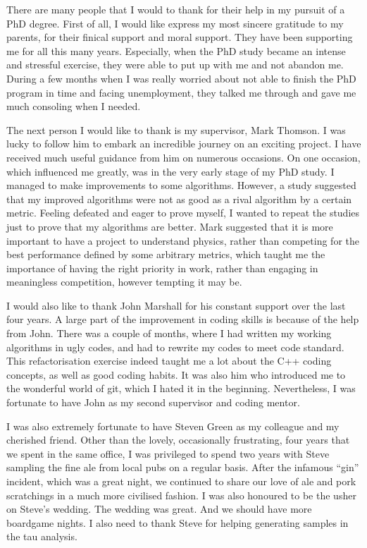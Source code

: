 \begin{acknowledgements}
There are many people that I would to thank  for their help in my pursuit of a PhD degree. First of all, I would like express my most sincere gratitude to my parents, for their finical support and moral support. They have been supporting me for all this many years. Especially, when the PhD study became an intense and stressful exercise, they were able to put up with me and not abandon me. During a few months when I was really worried about not able to finish the PhD program in time and facing unemployment, they talked me through and gave me much consoling  when I needed.

The next person I would like to thank is my supervisor, Mark Thomson. I was lucky to follow him to embark an incredible journey on an exciting project. I have received much useful guidance from him on numerous occasions. On one occasion, which influenced me greatly, was in the very early stage of my PhD study. I managed to make improvements to some algorithms. However, a study suggested that my improved algorithms were not as good as a rival algorithm by a certain metric. Feeling defeated and eager to prove myself, I wanted to repeat the studies just to prove that my algorithms are better. Mark suggested that it is more important to have a project to understand physics, rather than competing for the best performance defined by some arbitrary metrics, which taught me the importance of having the right priority in work, rather than engaging in meaningless competition, however tempting it may be.

I would also like to thank John Marshall for his constant support over the last four years. A large part of the improvement in coding skills is because of the help from John. There was a couple of months, where I had written my working algorithms in ugly codes, and had to rewrite my codes to meet \pandora code standard. This refactorisation exercise indeed taught me a lot about the C++ coding concepts, as well as good coding habits. It was also him who introduced me to the wonderful world of git, which I hated it in the beginning. Nevertheless, I was fortunate to have John as my second supervisor and coding mentor.

I was also extremely fortunate to have Steven Green as my colleague and my cherished friend. Other than the lovely, occasionally frustrating, four years that we spent in the same office,   I was privileged to spend two years with Steve sampling the fine ale from local pubs on a regular basis. After the infamous ``gin'' incident, which was a great night, we continued to share our love of ale and pork scratchings in a much more civilised fashion. I was also honoured to be the usher on Steve's wedding. The wedding was great. And we should have more boardgame nights. I also need to thank Steve for helping generating samples in the tau analysis. 


\end{acknowledgements}
